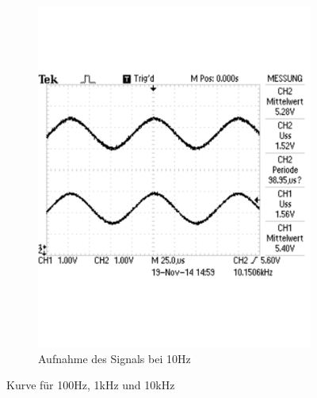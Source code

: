 \documentclass[12pt,a4paper]{article}
\begin{document}
\begin{figure}[H]
\begin{subfigure}[b]{0.28\textwidth}
                \includegraphics[width=\textwidth , scale = 0.4]{2_2_10k.pdf}
                \caption[Aufnahme des Signals bei 10kHz]{Aufnahme des Signals bei 10Hz}
  				\label{fig:2_2_10k}
        \end{subfigure}
        \caption{Kurve  für 100Hz, 1kHz und 10kHz}
        \label{fig:2_2_a}
\end{figure}
\end{document}
